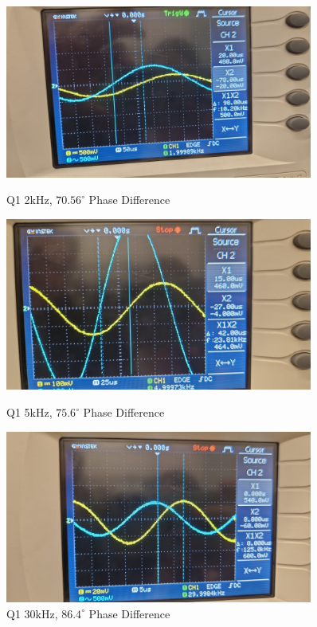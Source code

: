 \begin{figure}[h]
    \centering
    \begin{minipage}{0.5\textwidth}
        \includegraphics[width=0.9\textwidth , height=0.2\textheight]{assets/exp/q1-2kHz-1vpp-phase.jpeg}
        \caption{Q1 2kHz, $70.56^{\circ}$ Phase Difference}
        \label{fig:q1-2kHz-1vpp-phase}
    \end{minipage}%
    \begin{minipage}{0.5\textwidth}
        \includegraphics[width=0.9\textwidth , height=0.2\textheight]{assets/exp/q1-5kHz-1vpp-phase.jpeg}
        \caption{Q1 5kHz, $75.6^{\circ}$ Phase Difference}
        \label{fig:q1-5kHz-1vpp-phase}
    \end{minipage}
    \begin{minipage}{0.5\textwidth}
        \includegraphics[width=0.9\textwidth , height=0.2\textheight]{assets/exp/q1-30kHz-1vpp-phase.jpeg}
        \caption{Q1 30kHz, $86.4^{\circ}$ Phase Difference}
        \label{fig:q1-30kHz-1vpp-phase}
    \end{minipage}
\end{figure}

